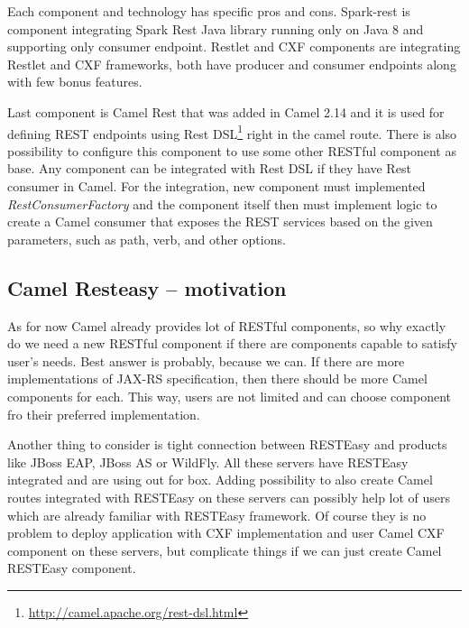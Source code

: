 \documentclass[12pt,final,oneside]{fithesis2}
\begin{document}
Each component and technology has specific pros and cons. Spark-rest is component integrating Spark Rest Java library running only on Java 8 and supporting only consumer endpoint. Restlet and CXF components are integrating Restlet and CXF frameworks, both have producer and consumer endpoints along with few bonus features. 

Last component is Camel Rest that was added in Camel 2.14 and it is used for defining REST endpoints using Rest DSL\footnote{\url{http://camel.apache.org/rest-dsl.html}} right in the camel route. There is also possibility to configure this component to use some other RESTful component as base. Any component can be integrated with Rest DSL if they have Rest consumer in Camel. For the integration, new component must implemented \textit{RestConsumerFactory} and the component itself then must implement logic to create a Camel consumer that exposes the REST services based on the given parameters, such as path, verb, and other options.

\subsection{Camel Resteasy -- motivation}
As for now Camel already provides lot of RESTful components, so why exactly do we need a new RESTful component if there are components capable to satisfy user's needs. Best answer is probably, because we can. If there are more implementations of JAX-RS specification, then there should be more Camel components for each. This way, users are not limited and can choose component fro their preferred implementation. 

Another thing to consider is tight connection between RESTEasy and products like JBoss EAP, JBoss AS or WildFly. All these servers have RESTEasy integrated and are using out for box. Adding possibility to also create Camel routes integrated with RESTEasy on these servers can possibly help lot of users which are already familiar with RESTEasy framework. Of course they is no problem to deploy application with CXF implementation and user Camel CXF component on these servers, but complicate things if we can just create Camel RESTEasy component. 

%
\end{document}
